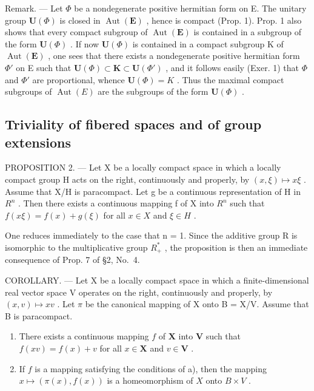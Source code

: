 Remark. --- Let \(\Phi\) be a nondegenerate positive hermitian form on E. The unitary group \(\mathbf{U}(\Phi)\) is closed in \(\operatorname{Aut}(\mathbf{E})\) , hence is compact (Prop. 1). Prop. 1 also shows that every compact subgroup of \(\operatorname{Aut}(\mathbf{E})\) is contained in a subgroup of the form \(\mathbf{U}(\Phi)\) . If now \(\mathbf{U}(\Phi)\) is contained in a compact subgroup K of \(\operatorname{Aut}(\mathbf{E})\) , one sees that there exists a nondegenerate positive hermitian form \(\Phi'\) on E such that \(\mathbf{U}(\Phi) \subset \mathbf{K} \subset \mathbf{U}(\Phi')\) , and it follows easily (Exer. 1) that \(\Phi\) and \(\Phi'\) are proportional, whence \(\mathbf{U}(\Phi) = K\) . Thus the maximal compact subgroups of \(\operatorname{Aut}(E)\) are the subgroups of the form \(\mathbf{U}(\Phi)\) .

\subsection{Triviality of fibered spaces and of group extensions}

PROPOSITION 2. --- Let X be a locally compact space in which a locally compact group H acts on the right, continuously and properly, by \((x,\xi)\mapsto x\xi\) . Assume that X/H is paracompact. Let g be a continuous representation of H in \(R^{n}\) . Then there exists a continuous mapping f of X into \(R^{n}\) such that \(f(x\xi)=f(x)+g(\xi)\) for all \(x\in X\) and \(\xi\in H\) .

One reduces immediately to the case that n = 1. Since the additive group R is isomorphic to the multiplicative group \(R_{+}^{*}\) , the proposition is then an immediate consequence of Prop. 7 of §2, No.~4.

COROLLARY. --- Let X be a locally compact space in which a finite-dimensional real vector space V operates on the right, continuously and properly, by \((x,v)\mapsto xv\) . Let \(\pi\) be the canonical mapping of X onto B = X/V. Assume that B is paracompact.

\begin{enumerate}
\def\labelenumi{\alph{enumi})}
\item
  There exists a continuous mapping \(f\) of \(\mathbf{X}\) into \(\mathbf{V}\) such that \(f(xv) = f(x) + v\) for all \(x \in \mathbf{X}\) and \(v \in \mathbf{V}\) .
\item
  If \(f\) is a mapping satisfying the conditions of a), then the mapping \(x \mapsto (\pi(x), f(x))\) is a homeomorphism of \(X\) onto \(B \times V\) .
\end{enumerate}

